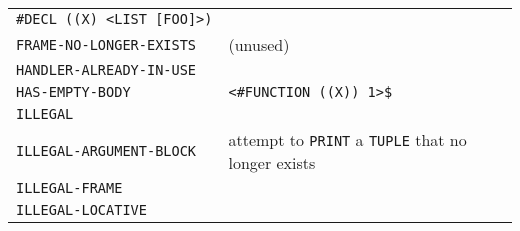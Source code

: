 \documentclass[a4paper,]{article}
\begin{document}
\begin{longtable}[]{@{}ll@{}}
\begin{minipage}[t]{0.36\columnwidth}
\texttt{\#DECL\ ((X)\ \textless{}LIST\ {[}FOO{]}\textgreater{})}\strut
\end{minipage}\tabularnewline
\begin{minipage}[t]{0.58\columnwidth}\raggedright\strut
\texttt{FRAME-NO-LONGER-EXISTS}\strut
\end{minipage} & \begin{minipage}[t]{0.36\columnwidth}\raggedright\strut
(unused)\strut
\end{minipage}\tabularnewline
\begin{minipage}[t]{0.58\columnwidth}\raggedright\strut
\texttt{HANDLER-ALREADY-IN-USE}\strut
\end{minipage} & \begin{minipage}[t]{0.36\columnwidth}\raggedright\strut
\strut
\end{minipage}\tabularnewline
\begin{minipage}[t]{0.58\columnwidth}\raggedright\strut
\texttt{HAS-EMPTY-BODY}\strut
\end{minipage} & \begin{minipage}[t]{0.36\columnwidth}\raggedright\strut
\texttt{\textless{}\#FUNCTION\ ((X))\ 1\textgreater{}\$}\strut
\end{minipage}\tabularnewline
\begin{minipage}[t]{0.58\columnwidth}\raggedright\strut
\texttt{ILLEGAL}\strut
\end{minipage} & \begin{minipage}[t]{0.36\columnwidth}\raggedright\strut
\strut
\end{minipage}\tabularnewline
\begin{minipage}[t]{0.58\columnwidth}\raggedright\strut
\texttt{ILLEGAL-ARGUMENT-BLOCK}\strut
\end{minipage} & \begin{minipage}[t]{0.36\columnwidth}\raggedright\strut
attempt to \texttt{PRINT} a \texttt{TUPLE} that no longer exists\strut
\end{minipage}\tabularnewline
\begin{minipage}[t]{0.58\columnwidth}\raggedright\strut
\texttt{ILLEGAL-FRAME}\strut
\end{minipage} & \begin{minipage}[t]{0.36\columnwidth}\raggedright\strut
\strut
\end{minipage}\tabularnewline
\begin{minipage}[t]{0.58\columnwidth}\raggedright\strut
\texttt{ILLEGAL-LOCATIVE}\strut
\end{minipage} & \begin{minipage}[t]{0.36\columnwidth}\raggedright\strut

\end{minipage}
\end{longtable}
\end{document}
